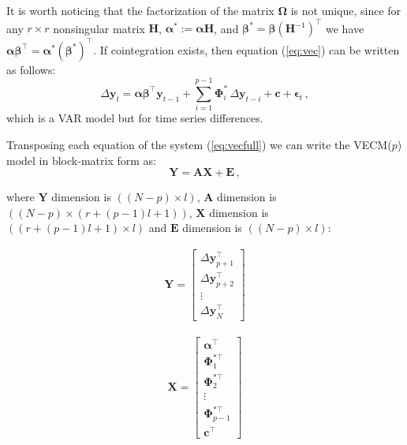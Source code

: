 It is worth noticing that the factorization of the matrix
$\boldsymbol\Omega$ is not unique, since for any $r \times r$
nonsingular matrix $\mathbf{H}$, $\boldsymbol{\alpha}^*:=\boldsymbol{\alpha}\mathbf{H}$,
and $\boldsymbol{\beta}^*=\boldsymbol{\beta}(\mathbf{H}^{-1})^\top$ we have
$\boldsymbol{\alpha\beta}^\top=\boldsymbol{\alpha}^*(\boldsymbol{\beta}^*)^\top$.
If cointegration exists, then equation (\ref{eq:vec}) can be written
as follows:
\begin{equation}\label{eq:vecfull}
\Delta\mathbf{y}_t 
= \boldsymbol{\alpha\beta}^\top\mathbf{y}_{t-1} 
  + \sum_{i=1}^{p-1}\boldsymbol{\Phi}_i^*\,\Delta\mathbf{y}_{t-i}
  + \mathbf{c} + \boldsymbol{\epsilon}_t\,,
\end{equation}
\noindent
which is a VAR model but for time series differences.


Transposing each equation of the system (\ref{eq:vecfull}) we can write
the VECM($p$) model in block-matrix form as:
\begin{equation}\label{eq:vareq}
\mathbf{Y} = 
\mathbf{A} \mathbf{X} + 
\mathbf{E} \, , 
\end{equation}

\noindent where $\mathbf{Y}$ dimension is $((N-p)\times l)$, $\mathbf{A}$
dimension is $((N-p)\times(r+(p-1)l +1))$, $\mathbf{X}$ dimension is $((r+(p-1)l
+1)\times l)$ and $\mathbf{E}$ dimension is $((N-p)\times l)$:

\begin{align}
\label{eq:vecY}
\mathbf{Y}
= \begin{bmatrix}
   \Delta\mathbf{y}_{p+1}^\top \\
   \Delta\mathbf{y}_{p+2}^\top \\
   \vdots \\
   \Delta\mathbf{y}_N^\top
   \end{bmatrix}
\end{align}

\begin{align}
\label{eq:vecX}
\mathbf{X}
= \begin{bmatrix}
   \boldsymbol{\alpha}^\top \\
   \boldsymbol{\Phi}_1^{*\top} \\
   \boldsymbol{\Phi}_2^{*\top} \\
   \vdots \\
   \boldsymbol{\Phi}_{p-1}^{*\top} \\
   \mathbf{c}^\top
   \end{bmatrix}
\end{align}

